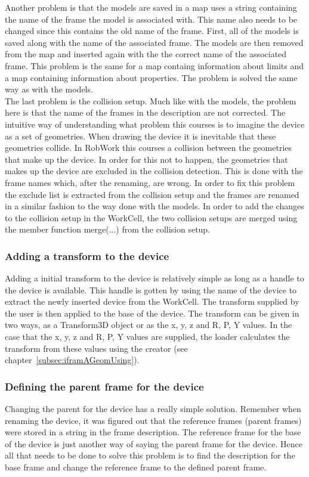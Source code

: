 Another problem is that the models are saved in a map uses a string containing the name of the frame the model is associated with. This name also needs to be changed since this contains the old name of the frame. First, all of the models is saved along with the name of the associated frame. The models are then removed from the map and inserted again with the the correct name of the associated frame. This problem is the same for a map containg information about limits and a map containing information about properties. The problem is solved the same way as with the models.\\

The last problem is the collision setup. Much like with the models, the problem here is that the name of the frames in the description are not corrected. The intuitive way of understanding what problem this courses is to imagine the device as a set of geometries. When drawing the device it is inevitable that these geometries collide. In RobWork this courses a collision between the geometries that make up the device. In order for this not to happen, the geometries that makes up the device are excluded in the collision detection. This is done with the frame names which, after the renaming, are wrong. In order to fix this problem the exclude list is extracted from the collision setup and the frames are renamed in a similar fashion to the way done with the models. In order to add the changes to the collision setup in the WorkCell, the two collision setups are merged using the member function merge(...) from the collision setup.

\subsubsection{Adding a transform to the device}
Adding a initial transform to the device is relatively simple as long as a handle to the device is available. This handle is gotten by using the name of the device to extract the newly inserted device from the WorkCell. The transform supplied by the user is then applied to the base of the device. The transform can be given in two ways, as a Transform3D object or as the x, y, z and R, P, Y values. In the case that the x, y, z and R, P, Y values are supplied, the loader calculates the transform from these values using the creator (see chapter~\ref{subsec:iframAGeomUsing}).

\subsubsection{Defining the parent frame for the device}
Changing the parent for the device has a really simple solution. Remember when renaming the device, it was figured out that the reference frames (parent frames) were stored in a string in the frame description. The reference frame for the base of the device is just another way of saying the parent frame for the device. Hence all that needs to be done to solve this problem is to find the description for the base frame and change the reference frame to the defined parent frame.


